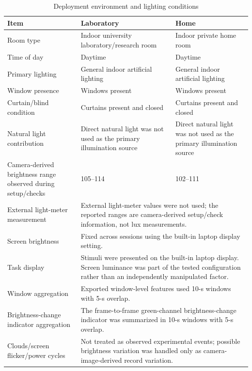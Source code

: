 \documentclass[dvipdfmx]{ehis}
\begin{document}
\begin{table}[t]
\caption{Deployment environment and lighting conditions}
\label{tab:environment_config}
\begin{center}
\small
\begin{tabular}{p{}p{}p{}}
\toprule
\textbf{Item} & \textbf{Laboratory} & \textbf{Home} \\
\midrule
Room type & Indoor university laboratory/research room & Indoor private home room \\
Time of day & Daytime & Daytime \\
Primary lighting & General indoor artificial lighting & General indoor artificial lighting \\
Window presence & Windows present & Windows present \\
Curtain/blind condition & Curtains present and closed & Curtains present and closed \\
Natural light contribution & Direct natural light was not used as the primary illumination source & Direct natural light was not used as the primary illumination source \\
Camera-derived brightness range observed during setup/checks & 105--114 & 102--111 \\
External light-meter measurement & \multicolumn{2}{p{0.64\textwidth}}{External light-meter values were not used; the reported ranges are camera-derived setup/check information, not lux measurements.} \\
Screen brightness & \multicolumn{2}{p{0.64\textwidth}}{Fixed across sessions using the built-in laptop display setting.} \\
Task display & \multicolumn{2}{p{0.64\textwidth}}{Stimuli were presented on the built-in laptop display. Screen luminance was part of the tested configuration rather than an independently manipulated factor.} \\
Window aggregation & \multicolumn{2}{p{0.64\textwidth}}{Exported window-level features used 10-s windows with 5-s overlap.} \\
Brightness-change indicator aggregation & \multicolumn{2}{p{0.64\textwidth}}{The frame-to-frame green-channel brightness-change indicator was summarized in 10-s windows with 5-s overlap.} \\
Clouds/screen flicker/power cycles & \multicolumn{2}{p{0.64\textwidth}}{Not treated as observed experimental events; possible brightness variation was handled only as camera-image-derived record variation.} \\
\bottomrule
\end{tabular}
\end{center}
\end{table}
\end{document}
